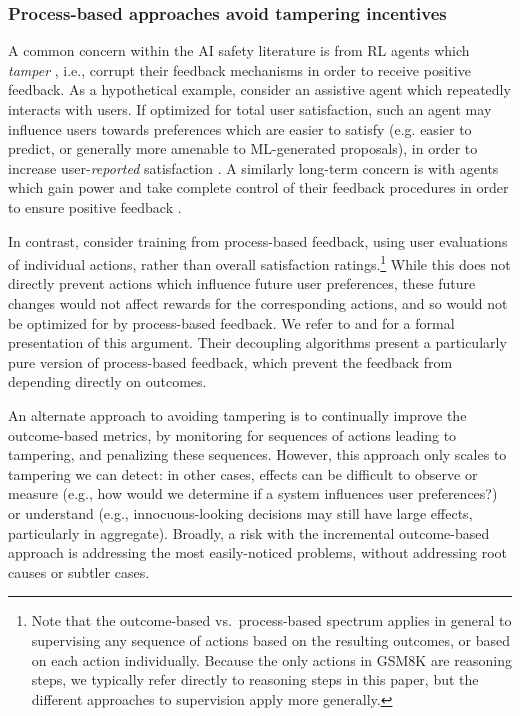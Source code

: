\documentclass[11pt, a4paper, logo]{deepmind}
\begin{document}
{\subsubsection{Process-based approaches avoid tampering incentives}

A common concern within the AI safety literature is from RL agents which \emph{tamper} \citep{everitt2017reinforcement}, i.e., corrupt their feedback mechanisms in order to receive positive feedback.
As a hypothetical example, consider an assistive agent which repeatedly interacts with users.
If optimized for total user satisfaction, such an agent may influence users towards preferences which are easier to satisfy (e.g. easier to predict, or generally more amenable to ML-generated proposals), in order to increase user-\emph{reported} satisfaction \citep{kenton2021alignment}.
A similarly long-term concern is with agents which gain power and take complete control of their feedback procedures in order to ensure positive feedback \citep{cotra2022without}.

In contrast, consider training from process-based feedback, using user evaluations of individual actions, rather than overall satisfaction ratings.\footnote{Note that the outcome-based vs.\ process-based spectrum applies in general to supervising any sequence of actions based on the resulting outcomes, or based on each action individually. Because the only actions in GSM8K are reasoning steps, we typically refer directly to reasoning steps in this paper, but the different approaches to supervision apply more generally.}
While this does not directly prevent actions which influence future user preferences, these future changes would not affect rewards for the corresponding actions, and so would not be optimized for by process-based feedback.
We refer to \citet{kumar2020realab} and \citet{uesato2020decoupled} for a formal presentation of this argument.
Their decoupling algorithms present a particularly pure version of process-based feedback, which prevent the feedback from depending directly on outcomes.


An alternate approach to avoiding tampering is to continually improve the outcome-based metrics, by monitoring for sequences of actions leading to tampering, and penalizing these sequences.
However, this approach only scales to tampering we can detect: in other cases, effects can be difficult to observe or measure (e.g., how would we determine if a system influences user preferences?) or understand (e.g., innocuous-looking decisions may still have large effects, particularly in aggregate).
Broadly, a risk with the incremental outcome-based approach is addressing the most easily-noticed problems, without addressing root causes or subtler cases.









}
\end{document}

